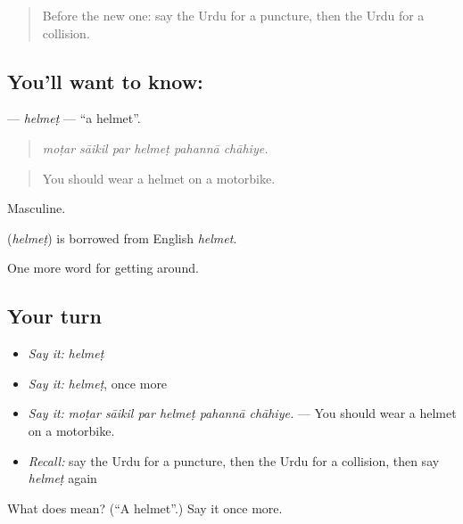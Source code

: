\label{lesson:UR-C395-helmet}



\begin{quote}
Before the new one: say the Urdu for a puncture, then the Urdu for a collision.
\end{quote}

\subsection*{You'll want to know: }
\textbf{} — \emph{helmeṭ} — \textquotedblleft{}a helmet\textquotedblright{}.

\begin{quote}
     
\end{quote}

\begin{quote}
\emph{moṭar sāikil par helmeṭ pahannā chāhiye.}
\end{quote}

\begin{quote}
You should wear a helmet on a motorbike.
\end{quote}

Masculine.

\begin{cousinweb}
\textbf{} (\emph{helmeṭ}) is borrowed from English \emph{helmet}.
\end{cousinweb}

\begin{grammarlens}[title={What you've built}]
One more word for getting around.
\end{grammarlens}

\subsection*{Your turn}
\begin{itemize}
\raggedright
  \item \emph{Say it:} \emph{helmeṭ}
  \item \emph{Say it:} \emph{helmeṭ}, once more
  \item \emph{Say it:} \emph{moṭar sāikil par helmeṭ pahannā chāhiye.} — You should wear a helmet on a motorbike.
  \item \emph{Recall:} say the Urdu for a puncture, then the Urdu for a collision, then say \emph{helmeṭ} again
\end{itemize}

\begin{tcolorbox}[breakable,colback=teal!4,colframe=teal!35!black,title={Before you move on}]
What does  mean? (\textquotedblleft{}A helmet\textquotedblright{}.) Say it once more.
\end{tcolorbox}
